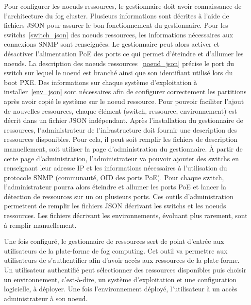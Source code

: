\documentclass[letterpaper, 10 pt, conference]{ieeeconf}
\begin{document}
Pour configurer les noeuds ressources, le gestionnaire doit avoir connaissance de l'architecture du fog cluster. Plusieurs informations sont décrites à l'aide de fichiers JSON pour assurer le bon fonctionnement du gestionnaire. Pour les switchs~\ref{switch_json} des noeuds ressources, les informations nécessaires aux connexions SNMP sont renseignées. Le gestionnaire peut alors activer et désactiver l'alimentation PoE des ports ce qui permet d'éteindre et d'allumer les noeuds. La description des noeuds ressources~\ref{noeud_json} précise le port du switch sur lequel le noeud est branché ainsi que son identifiant utilisé lors du boot PXE. Des informations sur chaque système d'exploitation à installer~\ref{env_json} sont nécessaires afin de configurer correctement les partitions après avoir copié le système sur le noeud ressource.
Pour pouvoir faciliter l'ajout de nouvelles ressources, chaque élément (switch, ressource, environnement) est décrit dans un fichier JSON indépendant. Après l'installation du gestionnaire de ressources, l'administrateur de l'infrastructure doit fournir une description des ressources disponibles. Pour cela, il peut soit remplir les fichiers de description manuellement, soit utiliser la page d'administration du gestionnaire. À partir de cette page d'administration, l'administrateur va pouvoir ajouter des switchs en renseignant leur adresse IP et les informations nécessaires à l'utilisation du protocole SNMP (communauté, OID des ports PoE). Pour chaque switch, l'administrateur pourra alors éteindre et allumer les ports PoE et lancer la détection de ressources sur un ou plusieurs ports. Ces outils d'administration permettent de remplir les fichiers JSON décrivant les switchs et les noeuds ressources. Les fichiers décrivant les environnements, évoluant plus rarement, sont à remplir manuellement.

Une fois configuré, le gestionnaire de ressources sert de point d'entrée aux utilisateurs de la plate-forme de fog computing. Cet outil va permettre aux utilisateurs de s'authentifier afin d'avoir accès aux ressources de la plate-forme. Un utilisateur authentifié peut sélectionner des ressources disponibles puis choisir un environnement, c'est-à-dire, un système d'exploitation et une configuration logicielle, à déployer. Une fois l'environnement déployé, l'utilisateur à un accès administrateur à son noeud.
\end{document}
